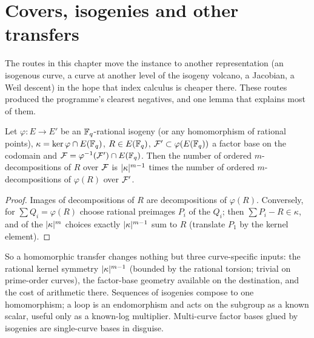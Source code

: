\chapter{Covers, isogenies and other transfers}\label{sec:transfer}

The routes in this chapter move the instance to another representation
(an isogenous curve, a curve at another level of the isogeny volcano, a
Jacobian, a Weil descent) in the hope that index calculus is cheaper there.
These routes produced the programme's clearest negatives, and one lemma
that explains most of them.

\begin{lemma}\label{lem:conservation}
Let $\varphi:E\to E'$ be an $\mathbb{F}_q$-rational isogeny (or any homomorphism
of rational points), $\kappa=\ker\varphi\cap E(\mathbb{F}_q)$, $R\in E(\mathbb{F}_q)$,
$\mathcal{F}'\subset\varphi(E(\mathbb{F}_q))$ a factor base on the codomain and
$\mathcal{F}=\varphi^{-1}(\mathcal{F}')\cap E(\mathbb{F}_q)$. Then the number of ordered
$m$-decompositions of $R$ over $\mathcal{F}$ is $\lvert \kappa \rvert^{m-1}$ times the number
of ordered $m$-decompositions of $\varphi(R)$ over $\mathcal{F}'$.
\end{lemma}
\begin{proof}
Images of decompositions of $R$ are decompositions of $\varphi(R)$.
Conversely, for $\sum Q_i=\varphi(R)$ choose rational preimages $P_i$ of
the $Q_i$; then $\sum P_i-R\in\kappa$, and of the $\lvert \kappa \rvert^m$ choices
exactly $\lvert \kappa \rvert^{m-1}$ sum to $R$ (translate $P_1$ by the kernel
element).
\end{proof}

So a homomorphic transfer changes nothing but three curve-specific inputs:
the rational kernel symmetry $\lvert \kappa \rvert^{m-1}$ (bounded by the rational
torsion; trivial on prime-order curves), the factor-base geometry
available on the destination, and the cost of arithmetic there. Sequences
of isogenies compose to one homomorphism; a loop is an endomorphism and
acts on the subgroup as a known scalar, useful only as a known-log
multiplier. Multi-curve factor bases glued by isogenies are single-curve
bases in disguise.

